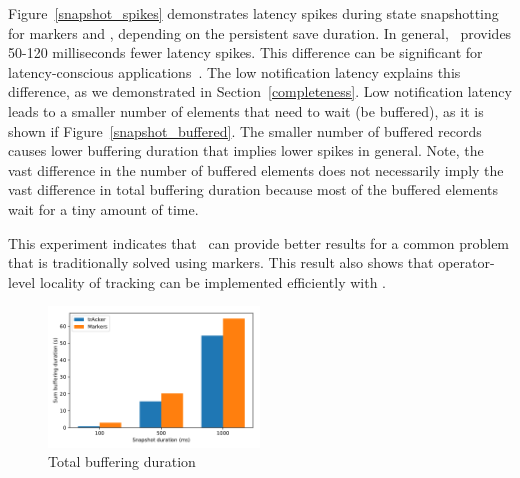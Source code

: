 Figure~\ref{snapshot_spikes} demonstrates latency spikes during state snapshotting for markers and \tracker , depending on the persistent save duration. In general, \tracker\ provides 50-120 milliseconds fewer latency spikes. This difference can be significant for latency-conscious applications~\cite{zhang2017sub}. The low notification latency explains this difference, as we demonstrated in Section~\ref{completeness}. Low notification latency leads to a smaller number of elements that need to wait (be buffered), as it is shown if Figure~\ref{snapshot_buffered}. The smaller number of buffered records causes lower buffering duration that implies lower spikes in general. Note, the vast difference in the number of buffered elements does not necessarily imply the vast difference in total buffering duration because most of the buffered elements wait for a tiny amount of time.

This experiment indicates that \tracker\ can provide better results for a common problem that is traditionally solved using markers. This result also shows that operator-level locality of tracking can be implemented efficiently with \tracker .

\begin{figure}[htbp]
  \centering
  \includegraphics[width=0.50\textwidth]{pics/buffering_sum_duration_bars.pdf}
  \caption{Total buffering duration}
\end{figure}

